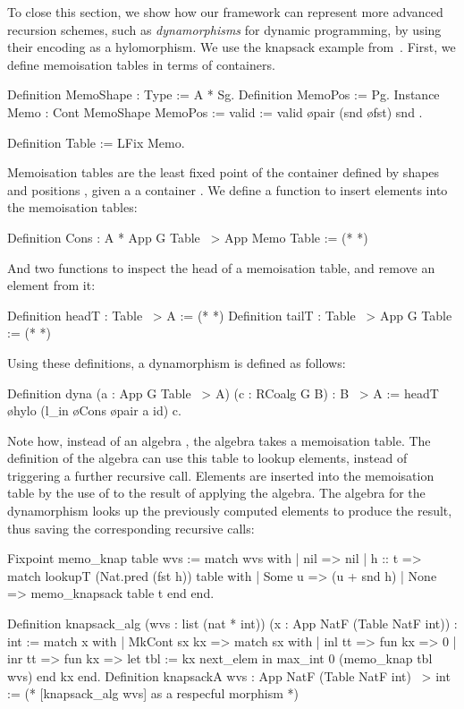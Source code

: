 \documentclass[anonymous, a4paper, UKenglish, cleveref, autoref, thm-restate]{lipics-v2021}
\begin{document}
To close this section, we show how our framework can represent more advanced
recursion schemes, such as \emph{dynamorphisms} for dynamic programming, by
using their encoding as a hylomorphism. We use the knapsack example
from~\cite{HinzeWG15}. First, we define memoisation tables in terms
of containers. 
\begin{coqcode}
Definition MemoShape : Type := A * Sg.
Definition MemoPos := Pg.
Instance Memo : Cont MemoShape MemoPos := { valid := valid \o pair (snd \o fst) snd }.

Definition Table := LFix Memo.
\end{coqcode}
Memoisation tables are the least fixed point of the container defined by shapes
 and positions , given a a container .
We define a function to insert elements into the memoisation tables:
\begin{coqcode}
  Definition Cons : A * App G Table ~> App Memo Table := (* *)
\end{coqcode}
And two functions to inspect the head of a memoisation table, and remove an
element from it:
\begin{coqcode}
Definition headT : Table ~> A := (* *)
Definition tailT : Table ~> App G Table := (* *)
\end{coqcode}
Using these definitions, a dynamorphism is defined as follows:
\begin{coqcode}
Definition dyna (a : App G Table ~> A) (c : RCoalg G B) : B ~> A
:= headT \o hylo (l_in \o Cons \o pair a id) c.
\end{coqcode}
Note how, instead of an algebra , the algebra takes a
memoisation table. The definition of the algebra can use this table to lookup
elements, instead of triggering a further recursive call. Elements are inserted
into the memoisation table by the use of  to the result of applying
the algebra. The algebra for the dynamorphism looks up the previously computed
elements to produce the result, thus saving the corresponding recursive calls:
\begin{coqcode}
Fixpoint memo_knap table wvs :=
  match wvs with | nil => nil | h :: t =>
      match lookupT (Nat.pred (fst h)) table with
      | Some u => (u + snd h)%
      | None => memo_knapsack table t
      end
  end.

Definition knapsack_alg (wvs : list (nat * int))
  (x : App NatF (Table NatF int)) : int :=
  match x with | MkCont sx kx => match sx with
  | inl tt => fun kx => 0%
  | inr tt => fun kx => let tbl := kx next_elem in max_int 0 (memo_knap tbl wvs)
  end kx end.
Definition knapsackA wvs : App NatF (Table NatF int) ~> int := 
  (* [knapsack_alg wvs] as a respecful morphism *)
\end{coqcode}
\end{document}
